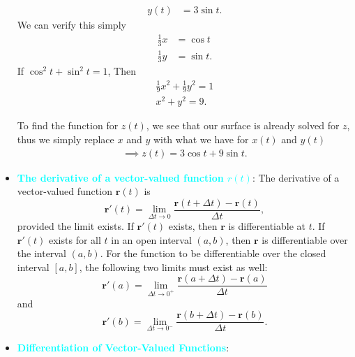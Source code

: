 \documentclass{report}
\begin{document}
\begin{itemize}
\begin{prop}
\begin{align*}
                   y(t) &= 3\sin{t}
               .\end{align*} 
               We can verify this simply
               \begin{align*}
                   \frac{1}{3}x &= \cos{t} \\
                   \frac{1}{3}y&=\sin{t}
               .\end{align*}
               If $\cos^{2}{t} + \sin^{2}{t} = 1 $, Then
               \begin{align*}
                   \frac{1}{9}x^{2} + \frac{1}{9}y^{2} = 1 \\
                   x^{2} + y^{2} = 9
               .\end{align*}
           \end{prop}
           To find the function for $z(t)$, we see that our surface is already solved for $z$, thus we simply replace $x$ and $y$ with what we have for $x(t)$ and $y(t)$
           \begin{align*}
               \implies z(t) = 3\cos{t} + 9 \sin{t}
           .\end{align*}
       \item \textbf{\textcolor{cyan}{The derivative of a vector-valued function $r(t)$}}:
           The derivative of a vector-valued function $\mathbf{r}(t)$ is
           \begin{equation}
               \mathbf{r}'(t) = \lim_{\Delta t \to 0} \frac{\mathbf{r}(t + \Delta t) - \mathbf{r}(t)}{\Delta t},
           \end{equation}
           provided the limit exists. If $\mathbf{r}'(t)$ exists, then $\mathbf{r}$ is differentiable at $t$. If $\mathbf{r}'(t)$ exists for all $t$ in an open interval $(a, b)$, then $\mathbf{r}$ is differentiable over the interval $(a, b)$. For the function to be differentiable over the closed interval $[a, b]$, the following two limits must exist as well:
           \begin{equation}
               \mathbf{r}'(a) = \lim_{\Delta t \to 0^+} \frac{\mathbf{r}(a + \Delta t) - \mathbf{r}(a)}{\Delta t}
           \end{equation}
           and
           \begin{equation}
               \mathbf{r}'(b) = \lim_{\Delta t \to 0^-} \frac{\mathbf{r}(b + \Delta t) - \mathbf{r}(b)}{\Delta t}.
           \end{equation}
       \item \textbf{\textcolor{cyan}{Differentiation of Vector-Valued Functions}}:

\end{itemize}
\end{document}
